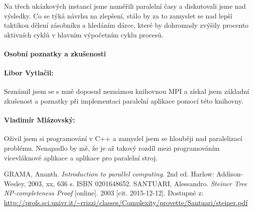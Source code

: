 \documentclass[12pt]{article}
\theoremstyle{definition}
\begin{document}
Na třech ukázkových instancí jsme naměřili paralelní časy a diskutovali jsme nad výsledky.
Co se týká návrhu na zlepšení, stálo by za to zamyslet se nad lepší taktikou dělení zásobníku
a hledáním dárce, které by dohromady zvýšily procento aktivních cyklů v hlavním výpočetním cyklu procesů.
\paragraph{Osobní poznatky a zkušenosti}\mbox{}
\paragraph{Libor Vytlačil:} Seznámil jsem se s mně doposud neznámou knihovnou MPI a získal
jsem základní zkušenost a poznatky při implementaci paralelní aplikace pomocí této knihovny.

\paragraph{Vladimír Mlázovský:} Oživil jsem si programování v C++ a zamyslel jsem se hlouběji nad paralelizací problému. Nenapadlo
by mě, že je až takový rozdíl mezi programováním vícevláknové aplikace a aplikace pro paralelní stroj.
\begin{thebibliography}{9}
	GRAMA, Ananth. \emph{Introduction to parallel computing}. 2nd ed. Harlow: Addison-Wesley, 2003, xx, 636 s. ISBN 0201648652.
	SANTUARI, Alessandro. \emph{Steiner Tree NP-completeness Proof} [online]. 2003 [cit. 2015-12-12]. Dostupné z: \url{http://profs.sci.univr.it/~rrizzi/classes/Complexity/provette/Santuari/steiner.pdf}	
\end{thebibliography}
\end{document}

